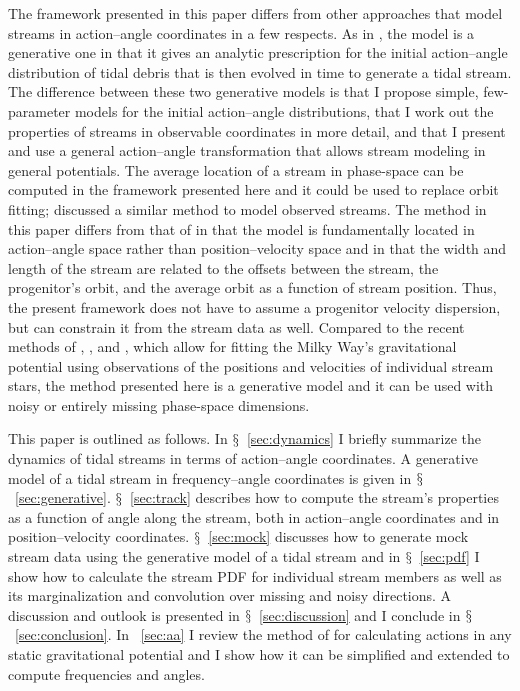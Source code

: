 \documentclass{emulateapj}
\newcommand{\sectionname}{$\mathsection$}
\begin{document}
The framework presented in this paper differs from other approaches
that model streams in action--angle coordinates in a few respects. As
in \citet{Helmi99a}, the model is a generative one in that it gives an
analytic prescription for the initial action--angle distribution of
tidal debris that is then evolved in time to generate a tidal
stream. The difference between these two generative models is that I
propose simple, few-parameter models for the initial action--angle
distributions, that I work out the properties of streams in observable
coordinates in more detail, and that I present and use a general
action--angle transformation that allows stream modeling in general
potentials. The average location of a stream in phase-space can be
computed in the framework presented here and it could be used to
replace orbit fitting; \citet{Varghese11a} discussed a similar method
to model observed streams. The method in this paper differs from that
of \citet{Varghese11a} in that the model is fundamentally located in
action--angle space rather than position--velocity space and in that
the width and length of the stream are related to the offsets between
the stream, the progenitor's orbit, and the average orbit as a
function of stream position. Thus, the present framework does not have
to assume a progenitor velocity dispersion, but can constrain it from
the stream data as well. Compared to the recent methods of
\citet{Penarrubia12a}, \citet{Sanders13b}, and \citet{PriceWhelan13a},
which allow for fitting the Milky Way's gravitational potential using
observations of the positions and velocities of individual stream
stars, the method presented here is a generative model and it can be
used with noisy or entirely missing phase-space dimensions.

This paper is outlined as follows. In \sectionname~\ref{sec:dynamics}
I briefly summarize the dynamics of tidal streams in terms of
action--angle coordinates. A generative model of a tidal stream in
frequency--angle coordinates is given in
\sectionname~\ref{sec:generative}. \sectionname~\ref{sec:track}
describes how to compute the stream's properties as a function of
angle along the stream, both in action--angle coordinates and in
position--velocity coordinates. \sectionname~\ref{sec:mock} discusses
how to generate mock stream data using the generative model of a tidal
stream and in \sectionname~\ref{sec:pdf} I show how to calculate the
stream PDF for individual stream members as well as its
marginalization and convolution over missing and noisy directions. A
discussion and outlook is presented in
\sectionname~\ref{sec:discussion} and I conclude in
\sectionname~\ref{sec:conclusion}. In \appendixname~\ref{sec:aa} I
review the method of \citet{Fox12a} for calculating actions in any
static gravitational potential and I show how it can be simplified and
extended to compute frequencies and angles.
\end{document}
